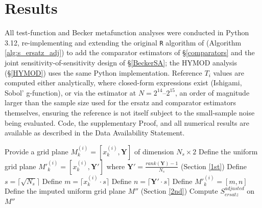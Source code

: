 \documentclass[12pt]{article}
\begin{document}
\section{Results}

All test-function and Becker metafunction analyses were conducted in Python 3.12, re-implementing and extending the original \texttt{R} algorithm of \citet{puy2024discrepancy} (Algorithm \ref{alg:s_ersatz_adj}) to add the comparator estimators of \S\ref{comparators} and the joint sensitivity-of-sensitivity design of \S\ref{BeckerSA}; the HYMOD analysis (\S\ref{HYMOD}) uses the same Python implementation. Reference $T_i$ values are computed either analytically, where closed-form expressions exist (Ishigami, Sobol' g-function), or via the \citet{jansen1999} estimator at $N=2^{14}$--$2^{15}$, an order of magnitude larger than the sample size used for the ersatz and comparator estimators themselves, ensuring the reference is not itself subject to the small-sample noise being evaluated. Code, the supplementary Proof, and all numerical results are available as described in the Data Availability Statement.

\begin{algorithm}[H]
\caption{Calculation of $S^{adjusted}_{ersatz}$ for an input $i$ of a specific function.}
\label{alg:s_ersatz_adj}
\begin{algorithmic}[1]
\STATE Provide a grid plane $M^{(i)}_k=[x^{(i)}_k,\bm{Y}]$ of dimension $N_s\times2$
\STATE Define the uniform grid plane ${M'}^{(i)}_k=[x^{(i)}_k,\bm{Y'}]$ where $\bm{Y'}=\frac{rank(\bm{Y})-1}{N_s}$ (Section \ref{1st})
\STATE Define $s=\lceil\sqrt{N_s}\rceil$
\STATE Define $m=\lceil x^{(i)}_k\cdot s\rceil$
\STATE Define $n=\lceil\bm{Y'}\cdot s\rceil$
\STATE Define ${M'}^{(i)}_k=[m,n]$
\STATE Define the imputed uniform grid plane ${M''}$ (Section \ref{2nd})
\STATE Compute $S^{adjusted}_{ersatz}$ on ${M''}$
\end{algorithmic}
\end{algorithm}
\end{document}
